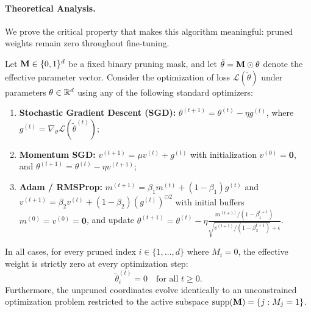 \paragraph{Theoretical Analysis.}

We prove the critical property that makes this algorithm meaningful: pruned
weights remain zero throughout fine-tuning.

\begin{theorem}
\label{thm:sparsity}
Let $\mathbf{M} \in \{0,1\}^d$ be a fixed binary pruning mask, and let $\tilde\theta = \mathbf{M} \odot \theta$ denote the effective parameter vector.
Consider the optimization of loss $\mathcal{L}(\tilde\theta)$ under parameters $\theta \in \mathbb{R}^d$ using any of the following standard optimizers:
\begin{enumerate}[label=(\alph*),leftmargin=1.5em,itemsep=1pt]
  \item \textbf{Stochastic Gradient Descent (SGD):} $\theta^{(t+1)} = \theta^{(t)} - \eta g^{(t)}$, where $g^{(t)} = \nabla_\theta \mathcal{L}(\tilde\theta^{(t)})$;
  \item \textbf{Momentum SGD:} $v^{(t+1)} = \mu v^{(t)} + g^{(t)}$ with initialization $v^{(0)} = \mathbf{0}$, and $\theta^{(t+1)} = \theta^{(t)} - \eta v^{(t+1)}$;
  \item \textbf{Adam / RMSProp:} $m^{(t+1)} = \beta_1 m^{(t)} + (1-\beta_1) g^{(t)}$ and $v^{(t+1)} = \beta_2 v^{(t)} + (1-\beta_2) (g^{(t)})^{\odot 2}$ with initial buffers $m^{(0)} = v^{(0)} = \mathbf{0}$, and update $\theta^{(t+1)} = \theta^{(t)} - \eta \frac{m^{(t+1)} / (1-\beta_1^{t+1})}{\sqrt{v^{(t+1)} / (1-\beta_2^{t+1})} + \epsilon}$.
\end{enumerate}
In all cases, for every pruned index $i \in \{1, \ldots, d\}$ where $M_i = 0$, the effective weight is strictly zero at every optimization step:
\begin{equation}
  \tilde\theta_i^{(t)} = 0 \quad \text{for all } t \geq 0.
\end{equation}
Furthermore, the unpruned coordinates evolve identically to an unconstrained optimization problem restricted to the active subspace $\operatorname{supp}(\mathbf{M}) = \{j : M_j = 1\}$.
\end{theorem}


